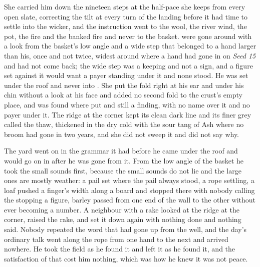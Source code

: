 She carried him down the nineteen steps at the half-pace she keeps from every open slate, correcting the tilt at every turn of the landing before it had time to settle into the wicker, and the instruction went to the wool, the river wind, the pot, the fire and the banked fire and never to the basket.  were gone around with a look from the basket's low angle and a wide step that belonged to a hand larger than his, once and not twice, widest around  where a hand had gone in on \emph{Seed 15} and had not come back; the wide step was a keeping and not a sign, and a figure set against it would want a payer standing under it and none stood. He was set under the roof and never into . She put the fold right at his ear and under his chin without a look at his face and added no second fold to the crust's empty place, and  was found where put and still a finding, with no name over it and no payer under it. The ridge at the corner kept its clean dark line and its finer grey called the thaw, thickened in the dry cold with the sour tang of Ash where no broom had gone in two years, and she did not sweep it and did not say why.

The yard went on in the grammar it had before he came under the roof and would go on in after he was gone from it. From the low angle of the basket he took the small sounds first, because the small sounds do not lie and the large ones are mostly weather: a pail set where the pail always stood, a rope settling, a loaf pushed a finger's width along a board and stopped there with nobody calling the stopping a figure, barley passed from one end of the wall to the other without ever becoming a number. A neighbour with a rake looked at the ridge at the corner, raised the rake, and set it down again with nothing done and nothing said. Nobody repeated the word that had gone up from the well, and the day's ordinary talk went along the rope from one hand to the next and arrived nowhere. He took the field as he found it and left it as he found it, and the satisfaction of that cost him nothing, which was how he knew it was not peace.

